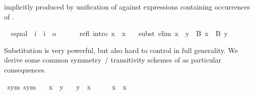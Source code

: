 \begin{isabellebody}
\begin{isamarkuptext}
  implicitly produced by unification of  against
  expressions containing occurrences of .%
\end{isamarkuptext}%
\isamarkuptrue%
\isamarkupfalse%
\isanewline
\ \ equal\ {}{}\ {}i\ {}\ i\ {}\ o{}\ \ {}\ {}{}{}\ {}{}{}\isanewline
{}\isanewline
\ \ refl\ {}intro{}{}\ {}x\ {}\ x{}\ \isanewline
\ \ subst\ {}elim{}{}\ {}x\ {}\ y\ {}\ B\ x\ {}\ B\ y{}%
\begin{isamarkuptext}%
\noindent Substitution is very powerful, but also hard to control in
  full generality.  We derive some common symmetry~/ transitivity
  schemes of as particular consequences.%
\end{isamarkuptext}%
\isamarkuptrue%
\isamarkupfalse%
\ sym\ {}sym{}{}\isanewline
\ \ \ {}x\ {}\ y{}\isanewline
\ \ \ {}y\ {}\ x{}\isanewline
%
\isadelimproof
%
\endisadelimproof
%
\isatagproof
{}\isamarkupfalse%
\ {}\isanewline
\ \ \isamarkupfalse%
\ {}x\ {}\ x{}\ \isamarkupfalse%

\end{isabellebody}
